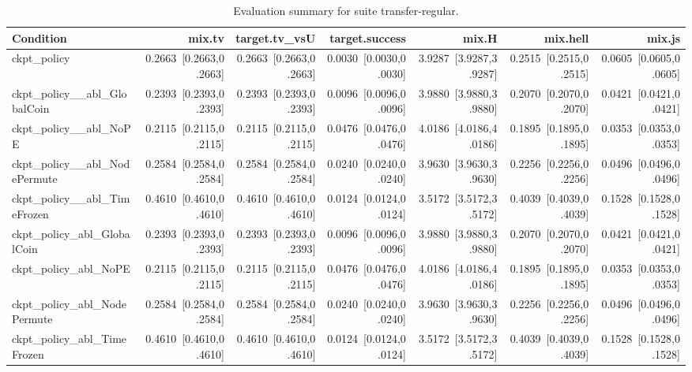 \begin{table}[t]
\centering
\caption{Evaluation summary for suite transfer-regular.}
\label{tab:eval_transfer-regular}
\begin{tabular}{lrrrrrr}
\toprule
Condition & mix.tv & target.tv\_vsU & target.success & mix.H & mix.hell & mix.js \\
\midrule
ckpt\_policy & 0.2663~[0.2663,0.2663] & 0.2663~[0.2663,0.2663] & 0.0030~[0.0030,0.0030] & 3.9287~[3.9287,3.9287] & 0.2515~[0.2515,0.2515] & 0.0605~[0.0605,0.0605] \\
ckpt\_policy\_\_abl\_GlobalCoin & 0.2393~[0.2393,0.2393] & 0.2393~[0.2393,0.2393] & 0.0096~[0.0096,0.0096] & 3.9880~[3.9880,3.9880] & 0.2070~[0.2070,0.2070] & 0.0421~[0.0421,0.0421] \\
ckpt\_policy\_\_abl\_NoPE & 0.2115~[0.2115,0.2115] & 0.2115~[0.2115,0.2115] & 0.0476~[0.0476,0.0476] & 4.0186~[4.0186,4.0186] & 0.1895~[0.1895,0.1895] & 0.0353~[0.0353,0.0353] \\
ckpt\_policy\_\_abl\_NodePermute & 0.2584~[0.2584,0.2584] & 0.2584~[0.2584,0.2584] & 0.0240~[0.0240,0.0240] & 3.9630~[3.9630,3.9630] & 0.2256~[0.2256,0.2256] & 0.0496~[0.0496,0.0496] \\
ckpt\_policy\_\_abl\_TimeFrozen & 0.4610~[0.4610,0.4610] & 0.4610~[0.4610,0.4610] & 0.0124~[0.0124,0.0124] & 3.5172~[3.5172,3.5172] & 0.4039~[0.4039,0.4039] & 0.1528~[0.1528,0.1528] \\
ckpt\_policy\_abl\_GlobalCoin & 0.2393~[0.2393,0.2393] & 0.2393~[0.2393,0.2393] & 0.0096~[0.0096,0.0096] & 3.9880~[3.9880,3.9880] & 0.2070~[0.2070,0.2070] & 0.0421~[0.0421,0.0421] \\
ckpt\_policy\_abl\_NoPE & 0.2115~[0.2115,0.2115] & 0.2115~[0.2115,0.2115] & 0.0476~[0.0476,0.0476] & 4.0186~[4.0186,4.0186] & 0.1895~[0.1895,0.1895] & 0.0353~[0.0353,0.0353] \\
ckpt\_policy\_abl\_NodePermute & 0.2584~[0.2584,0.2584] & 0.2584~[0.2584,0.2584] & 0.0240~[0.0240,0.0240] & 3.9630~[3.9630,3.9630] & 0.2256~[0.2256,0.2256] & 0.0496~[0.0496,0.0496] \\
ckpt\_policy\_abl\_TimeFrozen & 0.4610~[0.4610,0.4610] & 0.4610~[0.4610,0.4610] & 0.0124~[0.0124,0.0124] & 3.5172~[3.5172,3.5172] & 0.4039~[0.4039,0.4039] & 0.1528~[0.1528,0.1528] \\
\bottomrule
\end{tabular}
\end{table}
